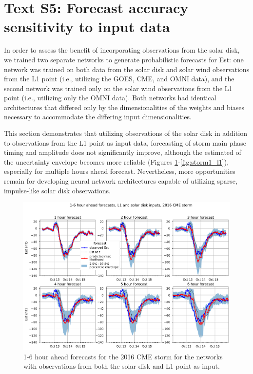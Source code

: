 \documentclass{agujournal2018}
\begin{document}
\section*{Text S5: Forecast accuracy sensitivity to input data}

In order to assess the benefit of incorporating observations from the solar disk, we trained two separate networks to generate probabilistic forecasts for Est: one network was trained on both data from the solar disk and solar wind observations from the L1 point (i.e., utilizing the GOES, CME, and OMNI data), and the second network was trained only on the solar wind observations from the L1 point (i.e., utilizing only the OMNI data). Both networks had identical architectures that differed only by the dimensionalities of the weights and biases necessary to accommodate the differing input dimensionalities.

This section demonstrates that utilizing observations of the solar disk in addition to observations from the L1 point as input data, forecasting of storm main phase timing and amplitude does not significantly improve, although the estimated of the uncertainty envelope becomes more reliable (Figures \ref{fig:storm1_both}-\ref{fig:storm1_l1}), especially for multiple hours ahead forecast. Nevertheless, more opportunities remain for developing neural network architectures capable of utilizing sparse, impulse-like solar disk observations.

\begin{figure}[htbp]
   \centering
   \includegraphics[width=1\textwidth]{figures/supplement/est_forecast_1-6_hour_L1&solardisk_storm1.pdf}
   \caption{1-6 hour ahead forecasts for the 2016 CME storm for the networks with observations from both the solar disk and L1 point as input.}
   \label{fig:storm1_both}
\end{figure}
\end{document}
